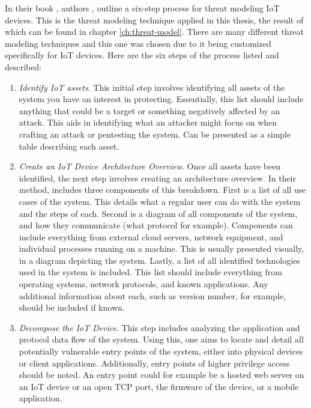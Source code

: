 In their book , authors \citeauthor{guzman2017iot}, outline a six-step process for threat modeling IoT devices. This is the threat modeling technique applied in this thesis, the result of which can be found in chapter \ref{ch:threat-model}. There are many different threat modeling techniques and this one was chosen due to it being customized specifically for IoT devices. Here are the six steps of the process listed and described:
\begin{enumerate}
    \item \textit{Identify IoT assets}. This initial step involves identifying all assets of the system you have an interest in protecting. Essentially, this list should include anything that could be a target or something negatively affected by an attack. This aids in identifying what an attacker might focus on when crafting an attack or pentesting the system. Can be presented as a simple table describing each asset.
    
    \item \textit{Create an IoT Device Architecture Overview}. Once all assets have been identified, the next step involves creating an architecture overview. In their method, \citeauthor{guzman2017iot} includes three components of this breakdown. First is a list of all use cases of the system. This details what a regular user can do with the system and the steps of each. Second is a diagram of all components of the system, and how they communicate (what protocol for example). Components can include everything from external cloud servers, network equipment, and individual processes running on a machine. This is usually presented visually, in a diagram depicting the system. Lastly, a list of all identified technologies used in the system is included. This list should include everything from operating systems, network protocols, and known applications. Any additional information about each, such as version number, for example, should be included if known.
    
    \item \textit{Decompose the IoT Device}. This step includes analyzing the application and protocol data flow of the system. Using this, one aims to locate and detail all potentially vulnerable entry points of the system, either into physical devices or client applications. Additionally, entry points of higher privilege access should be noted. An entry point could for example be a hosted web server on an IoT device or an open TCP port, the firmware of the device, or a mobile application.
    

\end{enumerate}
